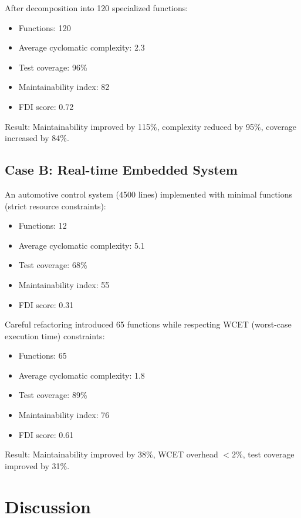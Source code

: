 \documentclass[a4paper,12pt]{article}
\theoremstyle{definition}
\begin{document}
After decomposition into 120 specialized functions:

\begin{itemize}
	\item Functions: 120
	\item Average cyclomatic complexity: 2.3
	\item Test coverage: 96\%
	\item Maintainability index: 82
	\item FDI score: 0.72
\end{itemize}

Result: Maintainability improved by 115\%, complexity reduced by 95\%, coverage increased by 84\%.

\subsection{Case B: Real-time Embedded System}

An automotive control system (4500 lines) implemented with minimal functions (strict resource constraints):

\begin{itemize}
	\item Functions: 12
	\item Average cyclomatic complexity: 5.1
	\item Test coverage: 68\%
	\item Maintainability index: 55
	\item FDI score: 0.31
\end{itemize}

Careful refactoring introduced 65 functions while respecting WCET (worst-case execution time) constraints:

\begin{itemize}
	\item Functions: 65
	\item Average cyclomatic complexity: 1.8
	\item Test coverage: 89\%
	\item Maintainability index: 76
	\item FDI score: 0.61
\end{itemize}

Result: Maintainability improved by 38\%, WCET overhead $< 2\%$, test coverage improved by 31\%.

\section{Discussion}
\end{document}
